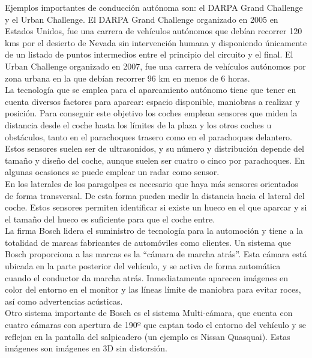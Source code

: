 Ejemplos importantes de conducción autónoma son: el DARPA Grand Challenge y el Urban Challenge. El DARPA Grand Challenge organizado en 2005 en Estados Unidos, fue una carrera de vehículos autónomos que debían recorrer 120 kms por el desierto de Nevada sin intervención humana y disponiendo únicamente de un listado de puntos intermedios entre el principio del circuito y el final. El Urban Challenge organizado en 2007, fue una carrera de vehículos autónomos por zona urbana en la que debían recorrer 96 km en menos de 6 horas. \\

La tecnología que se emplea para el aparcamiento autónomo tiene que tener en cuenta diversos factores para aparcar: espacio disponible, maniobras a realizar y posición. Para conseguir este objetivo los coches emplean sensores que miden la distancia desde el coche hasta los límites de la plaza y los otros coches u obstáculos, tanto en el parachoques trasero como en el parachoques delantero. Estos sensores suelen ser de ultrasonidos, y su número y distribución depende del tamaño y diseño del coche, aunque suelen ser cuatro o cinco por parachoques. En algunas ocasiones se puede emplear un radar como sensor.\\

En los laterales de los paragolpes es necesario que haya más sensores orientados de forma transversal. De esta forma pueden medir la distancia hacia el lateral del coche. Estos sensores permiten identificar si existe un hueco en el que aparcar y si el tamaño del hueco es suficiente para que el coche entre.\\

La firma Bosch lidera el suministro de tecnología para la automoción y tiene a la totalidad de marcas fabricantes de automóviles como clientes. Un sistema que Bosch proporciona a las marcas es la ``cámara de marcha atrás''. Esta cámara está ubicada en la parte posterior del vehículo, y se activa de forma automática cuando el conductor da marcha atrás. Inmediatamente aparecen imágenes en color del entorno en el monitor y las líneas límite de maniobra para evitar roces, así como advertencias acústicas.\\

Otro sistema importante de Bosch es el sistema Multi-cámara, que cuenta con cuatro cámaras con apertura de 190º que captan todo el entorno del vehículo y se reflejan en la pantalla del salpicadero (un ejemplo es Nissan Quasquai). Estas imágenes son imágenes en 3D sin distorsión.\\

